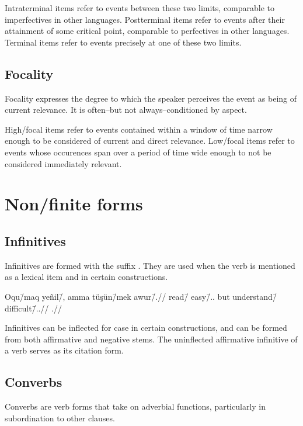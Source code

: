 Intraterminal items refer to events between these two limits, comparable to
imperfectives in other languages.
Postterminal items refer to events after their attainment of some critical
point, comparable to perfectives in other languages.
Terminal items refer to events precisely at one of these two limits.

\subsection{Focality}

Focality expresses the degree to which the speaker perceives the event as being
of current relevance.
It is often\---but not always\---conditioned by aspect.

High\-/focal items refer to events contained within a window of time narrow
enough to be considered of current and direct relevance.
Low\-/focal items refer to events whose occurences span over a period of time
wide enough to not be considered immediately relevant.

\section{Non\-/finite forms}

\subsection{Infinitives}

Infinitives are formed with the suffix .
They are used when the verb is mentioned as a lexical item and in certain
constructions.

\ex
  \begingl
    \gla Oqu\=/maq yeñil\=/\zero, amma tüşün\=/mek awur\=/\zero.//
    \glb read\=/\Inf{} easy\=/\Cop.\Prs.\Tsg{} but understand\=/\Inf{}
    difficult\=/\Cop.\Prs.\Tsg//
    \glft{}.//
  \endgl
\xe

Infinitives can be inflected for case in certain constructions, and can be
formed from both affirmative and negative stems.
The uninflected affirmative infinitive of a verb serves as its citation form.

\subsection{Converbs}

Converbs are verb forms that take on adverbial functions, particularly in
subordination to other clauses.

